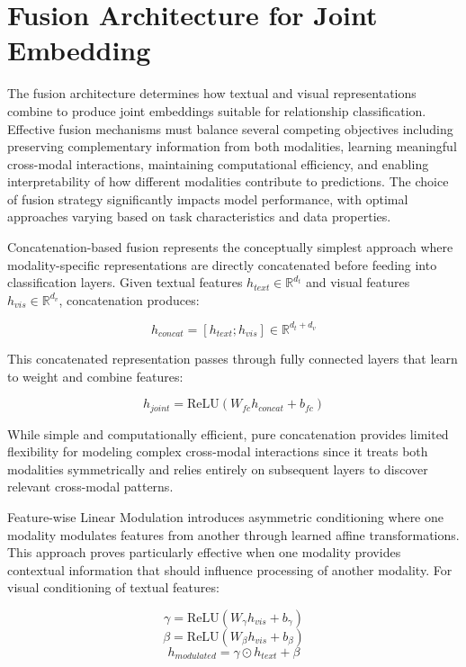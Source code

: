 \documentclass[12pt,a4paper]{report}
\begin{document}
\section{Fusion Architecture for Joint Embedding}

The fusion architecture determines how textual and visual representations combine to produce joint embeddings suitable for relationship classification. Effective fusion mechanisms must balance several competing objectives including preserving complementary information from both modalities, learning meaningful cross-modal interactions, maintaining computational efficiency, and enabling interpretability of how different modalities contribute to predictions. The choice of fusion strategy significantly impacts model performance, with optimal approaches varying based on task characteristics and data properties.

Concatenation-based fusion represents the conceptually simplest approach where modality-specific representations are directly concatenated before feeding into classification layers. Given textual features $h_{text} \in \mathbb{R}^{d_t}$ and visual features $h_{vis} \in \mathbb{R}^{d_v}$, concatenation produces:

\begin{equation}
h_{concat} = [h_{text}; h_{vis}] \in \mathbb{R}^{d_t + d_v}
\end{equation}

This concatenated representation passes through fully connected layers that learn to weight and combine features:

\begin{equation}
h_{joint} = \text{ReLU}(W_{fc}h_{concat} + b_{fc})
\end{equation}

While simple and computationally efficient, pure concatenation provides limited flexibility for modeling complex cross-modal interactions since it treats both modalities symmetrically and relies entirely on subsequent layers to discover relevant cross-modal patterns.

Feature-wise Linear Modulation introduces asymmetric conditioning where one modality modulates features from another through learned affine transformations. This approach proves particularly effective when one modality provides contextual information that should influence processing of another modality. For visual conditioning of textual features:

\begin{equation}
\gamma = \text{ReLU}(W_{\gamma}h_{vis} + b_{\gamma})
\end{equation}
\begin{equation}
\beta = \text{ReLU}(W_{\beta}h_{vis} + b_{\beta})
\end{equation}
\begin{equation}
h_{modulated} = \gamma \odot h_{text} + \beta
\end{equation}
\end{document}
